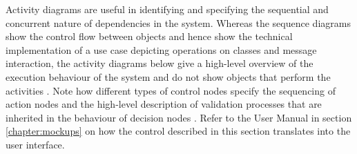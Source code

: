 Activity diagrams are useful in identifying and specifying the sequential and concurrent nature of dependencies in the system. Whereas the sequence diagrams show the control flow between objects and hence show the technical implementation of a use case depicting operations on classes and message interaction, the activity diagrams below give a high-level overview of the execution behaviour of the system and do not show objects that perform the activities \cite{UMLReference2004}. Note how different types of control nodes specify the sequencing of action nodes and the high-level description of validation processes that are inherited in the behaviour of decision nodes \cite{UML2017}.
Refer to the User Manual in section \ref{chapter:mockups} on how the control described in this section translates into the user interface.

